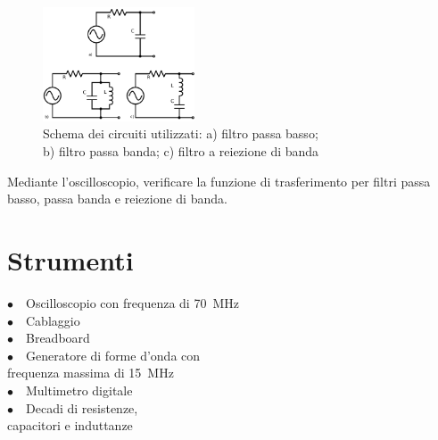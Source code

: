 \begin{figure}
	\centering
    \includegraphics[width=0.40\textwidth]{circuiti2.pdf}
    \caption{Schema dei circuiti utilizzati: a) filtro passa basso;\\ b) filtro passa banda; c) filtro a reiezione di banda}
    \label{fig:circuito}
\end{figure}

Mediante l'oscilloscopio, verificare la funzione di trasferimento per filtri passa basso, passa banda e reiezione di banda.
\section{Strumenti}

$\bullet \quad$Oscilloscopio con frequenza di \SI{70}{\mega\hertz}\\
$\bullet \quad$Cablaggio\\
$\bullet \quad$Breadboard\\
$\bullet \quad$Generatore di forme d'onda con\\
\phantom{xxx}frequenza massima di \SI{15}{\mega\hertz}\\
$\bullet \quad$Multimetro digitale\\
$\bullet \quad$Decadi di resistenze,\\
\phantom{xxx}capacitori e induttanze\\
